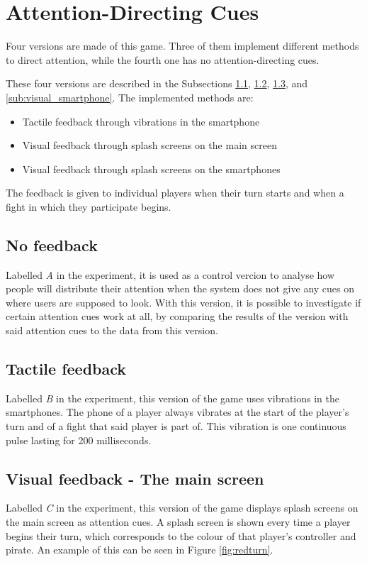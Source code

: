 \section{Attention-Directing Cues}
Four versions are made of this game. Three of them implement different methods to direct attention, while the fourth one has no attention-directing cues. 

These four versions are described in the Subsections \ref{sub:no_feedback}, \ref{sub:tactile_feedback}, \ref{sub:visual_main}, and \ref{sub:visual_smartphone}. The implemented methods are:

\begin{itemize}
\item Tactile feedback through vibrations in the smartphone
\item Visual feedback through splash screens on the main screen
\item Visual feedback through splash screens on the smartphones
\end{itemize}

The feedback is given to individual players when their turn starts and when a fight in which they participate begins.

\subsection{No feedback}\label{sub:no_feedback}
Labelled \textit{A} in the experiment, it is used as a control vercion to analyse how people will distribute their attention when the system does not give any cues on where users are supposed to look. With this version, it is possible to investigate if certain attention cues work at all, by comparing the results of the version with said attention cues to the data from this version.

\subsection{Tactile feedback}\label{sub:tactile_feedback}
Labelled \textit{B} in the experiment, this version of the game uses vibrations in the smartphones. The phone of a player always vibrates at the start of the player's turn and of a fight that said player is part of. This vibration is one continuous pulse lasting for 200 milliseconds.

\subsection{Visual feedback - The main screen}\label{sub:visual_main}
Labelled \textit{C} in the experiment, this version of the game displays splash screens on the main screen as attention cues. A splash screen is shown every time a player begins their turn, which corresponds to the colour of that player's controller and pirate. An example of this can be seen in Figure \ref{fig:redturn}.

